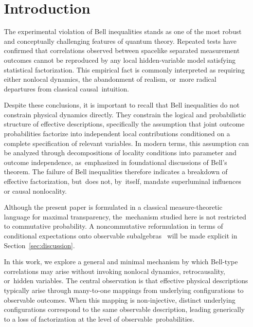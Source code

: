 \documentclass[quantumrep,article,accept,pdftex,oneauthor]{Definitions/mdpi}
\theoremstyle{remark}
\begin{document}
  \section{Introduction}
    \label{sec:introduction}

    The experimental violation of Bell inequalities stands as one of the most robust
    and conceptually challenging features of quantum theory.
    Repeated tests have confirmed that correlations observed between spacelike separated
    measurement outcomes cannot be reproduced by any local hidden-variable model
    satisfying statistical factorization.
    This empirical fact is commonly interpreted as requiring either nonlocal dynamics,
    the abandonment of realism, or~more radical departures from classical causal~intuition.

    Despite these conclusions, it is important to recall that Bell inequalities do not
    constrain physical dynamics directly.
    They constrain the logical and probabilistic structure of effective descriptions,
    specifically the assumption that joint outcome probabilities factorize into independent
    local contributions conditioned on a complete specification of relevant variables.
    In modern terms, this assumption can be analyzed through decompositions of locality
    conditions into parameter and outcome independence, as~emphasized in foundational
    discussions of Bell’s theorem.
    The failure of Bell inequalities therefore indicates a breakdown of effective
    factorization, but~does not, by~itself, mandate superluminal influences or causal
    nonlocality.

    Although the present paper is formulated in a classical measure-theoretic language
    for maximal transparency, the~mechanism studied here is not restricted to commutative
    probability.
    A noncommutative reformulation in terms of conditional expectations onto observable
    subalgebras~\cite{AccardiCecchini1982} will be made explicit in Section~\ref{sec:discussion}.

    In this work, we explore a general and minimal mechanism by which Bell-type
    correlations may arise without invoking nonlocal dynamics, retrocausality, or~hidden
    variables.
    The central observation is that effective physical descriptions typically arise through
    many-to-one mappings from underlying configurations to observable outcomes.
    When this mapping is non-injective, distinct underlying configurations correspond
    to the same observable description, leading generically to a loss of factorization at
    the level of observable~probabilities.
\end{document}
